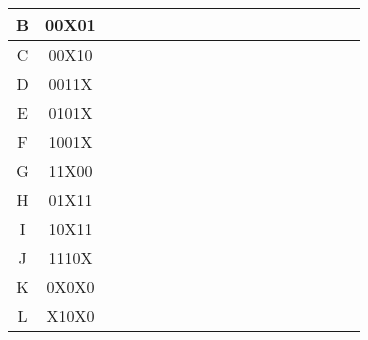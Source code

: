 \documentclass{article}
\begin{document}
\begin{flushleft}
\begin{tabular}{|c|c|r*{15}{|c}|}
    B & 00X01&\makecell{ }&&\makecell{ }&&\makecell{ }&\makecell{ }&\makecell{ }&\makecell{ }&\makecell{ }&\makecell{ }&\makecell{ }&\makecell{ }&\makecell{ }&\makecell{ }&\makecell{ }\\ \hline
    C & 00X10&\makecell{ }&\makecell{ }&&\makecell{ }&&\makecell{ }&\makecell{ }&\makecell{ }&\makecell{ }&\makecell{ }&\makecell{ }&\makecell{ }&\makecell{ }&\makecell{ }&\makecell{ }\\ \hline
    D & 0011X&\makecell{ }&\makecell{ }&\makecell{ }&\makecell{ }&&&\makecell{ }&\makecell{ }&\makecell{ }&\makecell{ }&\makecell{ }&\makecell{ }&\makecell{ }&\makecell{ }&\makecell{ }\\ \hline
    E & 0101X&\makecell{ }&\makecell{ }&\makecell{ }&\makecell{ }&\makecell{ }&\makecell{ }&&&\makecell{ }&\makecell{ }&\makecell{ }&\makecell{ }&\makecell{ }&\makecell{ }&\makecell{ }\\ \hline
    F & 1001X&\makecell{ }&\makecell{ }&\makecell{ }&\makecell{ }&\makecell{ }&\makecell{ }&\makecell{ }&\makecell{ }&\makecell{ }&&&\makecell{ }&\makecell{ }&\makecell{ }&\makecell{ }\\ \hline
    G & 11X00&\makecell{ }&\makecell{ }&\makecell{ }&\makecell{ }&\makecell{ }&\makecell{ }&\makecell{ }&\makecell{ }&\makecell{ }&\makecell{ }&\makecell{ }&\makecell{ }&&&\makecell{ }\\ \hline
    H & 01X11&\makecell{ }&\makecell{ }&\makecell{ }&\makecell{ }&\makecell{ }&\makecell{ }&\makecell{ }&&&\makecell{ }&\makecell{ }&\makecell{ }&\makecell{ }&\makecell{ }&\makecell{ }\\ \hline
    I & 10X11&\makecell{ }&\makecell{ }&\makecell{ }&\makecell{ }&\makecell{ }&\makecell{ }&\makecell{ }&\makecell{ }&\makecell{ }&\makecell{ }&&&\makecell{ }&\makecell{ }&\makecell{ }\\ \hline
    J & 1110X&\makecell{ }&\makecell{ }&\makecell{ }&\makecell{ }&\makecell{ }&\makecell{ }&\makecell{ }&\makecell{ }&\makecell{ }&\makecell{ }&\makecell{ }&\makecell{ }&\makecell{ }&&\\ \hline
    K & 0X0X0&&\makecell{ }&&\makecell{ }&\makecell{ }&\makecell{ }&&\makecell{ }&\makecell{ }&\makecell{ }&\makecell{ }&\makecell{ }&\makecell{ }&\makecell{ }&\makecell{ }\\ \hline
    L & X10X0&\makecell{ }&\makecell{ }&\makecell{ }&\makecell{ }&\makecell{ }&\makecell{ }&&\makecell{ }&\makecell{ }&\makecell{ }&\makecell{ }&\makecell{ }&&\makecell{ }&\makecell{ }\\ \hline

\end{tabular}
\end{flushleft}
\end{document}
